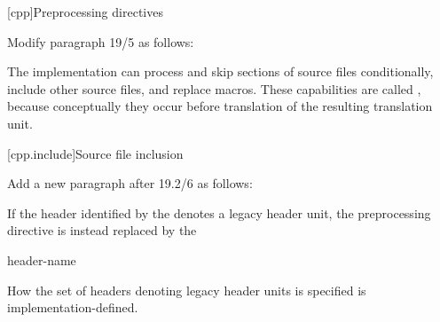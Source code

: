 \setcounter{chapter}{18}
[cpp]{Preprocessing directives}%

\begin{after}
Modify paragraph 19/5 as follows:

\begin{std.txt}
\resetalinea[4]
\alinea
The implementation can
process and skip sections of source files conditionally,
include other source files,
and replace macros.
These capabilities are called
,
because conceptually they occur
before translation of the resulting translation unit.
\end{std.txt}
\end{after}

\setcounter{section}{1}
[cpp.include]{Source file inclusion}%

\begin{after}
Add a new paragraph after 19.2/6 as follows:

\begin{std.txt}
\resetalinea[6]
\color{addclr}
\alinea
If the header identified by the 
denotes a legacy header unit, the preprocessing directive
is instead replaced by the 
\begin{bnf}
 header-name \terminal{;}
\end{bnf}
\color{addclr}
How the set of headers denoting legacy header units is specified
is implementation-defined.
\end{std.txt}
\end{after}

